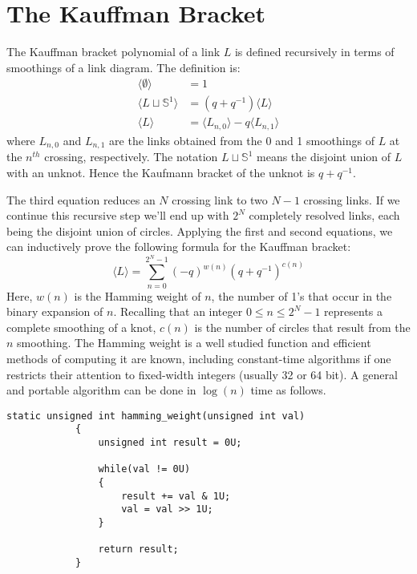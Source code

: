 \documentclass{article}
\theoremstyle{plain}
\begin{document}
    \section{The Kauffman Bracket}
        The Kauffman bracket polynomial of a link $L$ is defined recursively
        in terms of smoothings of a link diagram. The definition is:
        \begin{align}
            \langle\emptyset\rangle&=1\\
            \langle{L\sqcup\mathbb{S}^{1}}\rangle&=(q+q^{-1})\langle{L}\rangle\\
            \langle{L}\rangle&=
                \langle{L_{n,0}}\rangle-q\langle{L_{n,1}}\rangle
        \end{align}
        where $L_{n,0}$ and $L_{n,1}$ are the links obtained from the
        0 and 1 smoothings of $L$ at the $n^{th}$ crossing, respectively. The
        notation $L\sqcup\mathbb{S}^{1}$ means the disjoint union of
        $L$ with an unknot. Hence the Kaufmann bracket of the
        unknot is $q+q^{-1}$.
        \par\hfill\par
        The third equation reduces an $N$ crossing link to two $N-1$ crossing
        links. If we continue this recursive step we'll end up with
        $2^{N}$ completely resolved links, each being the disjoint union of
        circles. Applying the first and second equations, we can inductively
        prove the following formula for the Kauffman bracket:
        \begin{equation}
            \label{eqn:kauffman_bracket}%
            \langle{L}\rangle=\sum_{n=0}^{2^{N}-1}
                (-q)^{w(n)}(q+q^{-1})^{c(n)}
        \end{equation}
        Here, $w(n)$ is the Hamming weight of $n$, the number of 1's
        that occur in the binary expansion of $n$. Recalling that an integer
        $0\leq{n}\leq{2}^{N}-1$ represents a complete smoothing of a knot,
        $c(n)$ is the number of circles that result from the $n$ smoothing.
        The Hamming weight is a well studied function and efficient methods of
        computing it are known, including constant-time algorithms if one
        restricts their attention to fixed-width integers
        (usually 32 or 64 bit). A general and portable algorithm can be done in
        $\log(n)$ time as follows.
        \begin{lstlisting}[style=CStyle, gobble=12]
            static unsigned int hamming_weight(unsigned int val)
            {
                unsigned int result = 0U;

                while(val != 0U)
                {
                    result += val & 1U;
                    val = val >> 1U;
                }

                return result;
            }
        \end{lstlisting}
\end{document}
